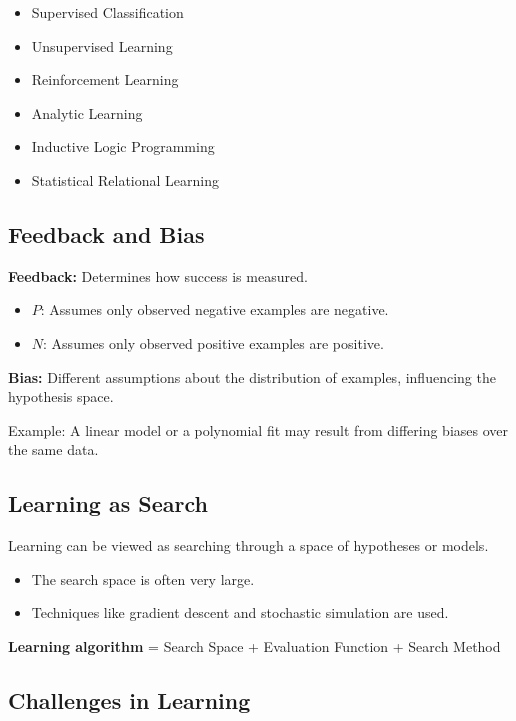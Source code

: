 \begin{itemize}
    \item Supervised Classification
    \item Unsupervised Learning
    \item Reinforcement Learning
    \item Analytic Learning
    \item Inductive Logic Programming
    \item Statistical Relational Learning
\end{itemize}

\subsection{Feedback and Bias}

\textbf{Feedback:} Determines how success is measured.

\begin{itemize}
    \item $P$: Assumes only observed negative examples are negative.
    \item $N$: Assumes only observed positive examples are positive.
\end{itemize}

\textbf{Bias:} Different assumptions about the distribution of examples, influencing the hypothesis space.

Example: A linear model or a polynomial fit may result from differing biases over the same data.

\subsection{Learning as Search}

Learning can be viewed as searching through a space of hypotheses or models.

\begin{itemize}
    \item The search space is often very large.
    \item Techniques like gradient descent and stochastic simulation are used.
\end{itemize}

\textbf{Learning algorithm} = Search Space + Evaluation Function + Search Method

\subsection{Challenges in Learning}

